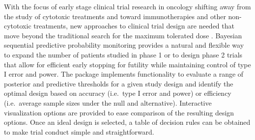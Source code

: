 With the focus of early stage clinical trial research in oncology
shifting away from the study of cytotoxic treatments and toward
immunotherapies and other non-cytotoxic treatments, new approaches to
clinical trial design are needed that move beyond the traditional search
for the maximum tolerated dose \citep{Hobbs2019}. Bayesian sequential
predictive probability monitoring provides a natural and flexible way to
expand the number of patients studied in phase 1 or to design phase 2
trials that allow for efficient early stopping for futility while
maintaining control of type I error and power. The 
package implements functionality to evaluate a range of posterior and
predictive thresholds for a given study design and identify the optimal
design based on accuracy (i.e.~type I error and power) or efficiency
(i.e.~average sample sizes under the null and alternative). Interactive
visualization options are provided to ease comparison of the resulting
design options. Once an ideal design is selected, a table of decision
rules can be obtained to make trial conduct simple and straightforward.

\begin{verbatim}
\end{verbatim}



\address{%
Emily C. Zabor\\
Department of Quantitative Health Sciences \& Taussig Cancer Institute,
Cleveland Clinic\\%
9500 Euclid Ave. CA-60\\ Cleveland, OH 44195 USA\\
%
\url{http://www.emilyzabor.com/}\\%
\textit{ORCiD: \href{https://orcid.org/0000-0002-1402-4498}{0000-0002-1402-4498}}\\%
\href{mailto:zabore2@ccf.org}{\nolinkurl{zabore2@ccf.org}}%
}

\address{%
Brian P. Hobbs\\
Dell Medical School, The University of Texas at Austin\\%
true\\ Austin, TX 78712\\
%
%
\textit{ORCiD: \href{https://orcid.org/0000-0003-2189-5846}{0000-0003-2189-5846}}\\%
\href{mailto:brian.hobbs@austin.utexas.edu}{\nolinkurl{brian.hobbs@austin.utexas.edu}}%
}

\address{%
Michael J. Kane\\
Department of Biostatistics, Yale University\\%
60 College Street\\ New Haven, CT 06511\\
%
%
\textit{ORCiD: \href{https://orcid.org/0000-0003-1899-6662}{0000-0003-1899-6662}}\\%
\href{mailto:michael.kane@yale.edu}{\nolinkurl{michael.kane@yale.edu}}%
}
